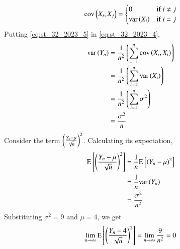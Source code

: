 \documentclass[journal,12pt,twocolumn]{IEEEtran}
\theoremstyle{remark}
\begin{document}
\begin{enumerate}
\begin{align}
    \text{cov}\brak{X_i, X_j} =
    \begin{cases}
        0 & \text{if } i \ne j\\
        \text{var}\brak{X_i} & \text{if } i = j
    \end{cases}\label{eq:st_32_2023_5}
\end{align}
Putting \eqref{eq:st_32_2023_5} in \eqref{eq:st_32_2023_4},
\begin{align}
    \text{var}\left(Y_n\right) &= \frac{1}{n^2} \left(\sum_{i=1}^{n} \text{cov}\left(X_i, X_i\right)\right)\\
     &= \frac{1}{n^2} \left(\sum_{i=1}^{n} \text{var}\left(X_i\right)\right)\\
     &= \frac{1}{n^2} \left(\sum_{i=1}^{n} \sigma^2\right)\\
     &= \frac{\sigma^2}{n}
\end{align}
Consider the term $\left(\frac{Y_n - \mu}{\sqrt{n}}\right)^2$. Calculating its expectation,
\begin{align}
    \text{E}{}\left[\left(\frac{Y_n - \mu}{\sqrt{n}}\right)^2\right] &= \frac{1}{n} \text{E}{}\left[\left(Y_n - \mu\right)^2\right]\\
    &= \frac{1}{n} \text{var}\left(Y_n\right)\\
    &= \frac{\sigma^2}{n^2}
\end{align}
Substituting $\sigma^2 = 9$ and $\mu = 4$, we get
\begin{align}
    \lim\limits_{n \to \infty} \text{E}\sbrak{\brak{\frac{Y_n - 4}{\sqrt{n}}}^2}
    = \lim\limits_{n \to \infty} \frac{9}{n^2} = 0 \label{eq:st_32}
\end{align}


\end{enumerate}
\end{document}
